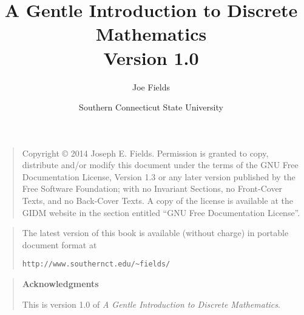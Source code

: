 \documentclass[dvips,12pt,twoside]{book}
\begin{document}
\frontmatter

\title{A Gentle Introduction to Discrete Mathematics\\ {\small Version 1.0}}
\author{Joe Fields}
\date{Southern Connecticut State University}

\maketitle

\clearpage

\rule{0pt}{0pt}

\vfill

\begin{quote}
    Copyright \copyright{}  2014  Joseph E. Fields.
    Permission is granted to copy, distribute and/or modify this document
    under the terms of the GNU Free Documentation License, Version 1.3
    or any later version published by the Free Software Foundation;
    with no Invariant Sections, no Front-Cover Texts, and no Back-Cover Texts.
    A copy of the license is available at the GIDM website in the section 
    entitled ``GNU Free Documentation License''.
\end{quote}

\vfill

\begin{quote}
The latest version of this book is available (without charge) in portable document format at \newline
\rule{0pt}{0pt} \hspace{1in} \verb+http://www.southernct.edu/~fields/+
\end{quote}

\vfill

\clearpage

\rule{0pt}{0pt}

\vfill

\begin{quote}
{\Large \bf Acknowledgments} 

   This is version 1.0 of {\em A Gentle Introduction to Discrete Mathematics}.
  
\end{quote}

\vfill

\clearpage

\tableofcontents

\listoffigures

\listoftables




\mainmatter
\end{document}
